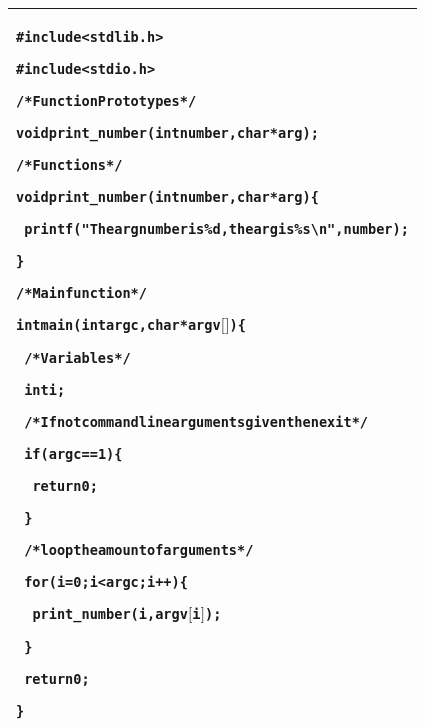 \documentclass[10pt]{article}
\begin{document}
\begin{center}
    \begin{tabularx}{\columnwidth}{@{\extracolsep{\fill}} |X| }
      \hline
\begin{alltt}
\#include<stdlib.h> 

\#include<stdio.h>


/* Function Prototypes */

void print\_number(int number, char * arg);


/* Functions */

void print\_number(int number, char * arg)\{

~  printf("The arg number is \%d, the arg is \%s \textbackslash n", number);

\}


/* Main function */

int main(int argc, char * argv$[$ $]$) \{

  
~  /* Variables */

~  int i;


~  /* If not command line arguments given then exit */

~  if ( argc == 1 ) \{

~  ~ return 0;

~  \}

  
~  /* loop the amount of arguments */

~  for(i=0;i<argc;i++) \{

~  ~  print\_number(i,argv$[$i$]$);

~  \}


~  return 0;

\}

\end{alltt}
    \\  \hline
    \end{tabularx}
\end{center}
\end{document}
